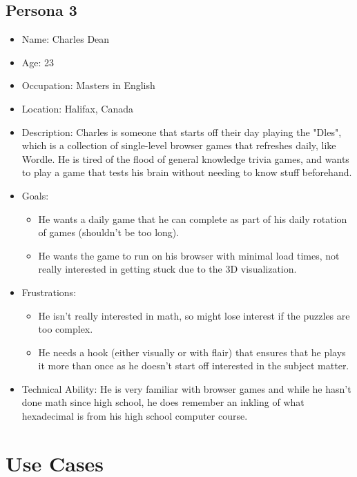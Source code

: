 \documentclass[12pt]{article}
\begin{document}
\subsection{Persona 3}
\begin{itemize}
\item Name: Charles Dean
\item Age: 23
\item Occupation: Masters in English
\item Location: Halifax, Canada
\item Description: Charles is someone that starts off their day playing the "Dles", which is a collection of single-level browser games that refreshes daily, like Wordle. He is tired of the flood of general knowledge trivia games, and wants to play a game that tests his brain without needing to know stuff beforehand.
\item Goals:
\begin{itemize}
  \item He wants a daily game that he can complete as part of his daily rotation of games (shouldn't be too long).
  \item He wants the game to run on his browser with minimal load times, not really interested in getting stuck due to the 3D visualization.
\end{itemize}
\item Frustrations:
\begin{itemize}
  \item He isn't really interested in math, so might lose interest if the puzzles are too complex.
  \item He needs a hook (either visually or with flair) that ensures that he plays it more than once as he doesn't start off interested in the subject matter.
\end{itemize}
\item Technical Ability: He is very familiar with browser games and while he hasn't done math since high school, he does remember an inkling of what hexadecimal is from his high school computer course. 
\end{itemize}


\section{Use Cases}
\end{document}
